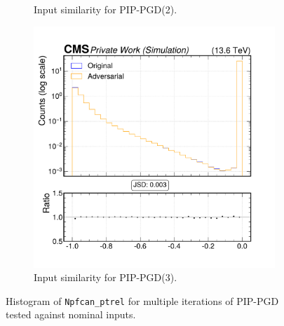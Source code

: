\begin{figure}[h]
\begin{subfigure}[t]{0.32\textwidth}
    \caption*{Input similarity for PIP-PGD(2).}
  \end{subfigure}\hfill
  \begin{subfigure}[t]{0.32\textwidth}
    \includegraphics[width=\linewidth]{media/output/features/compare/combined_it_3/cmp_npf_arr_Npfcan_ptrel.pdf}
    \caption*{Input similarity for PIP-PGD(3).}
  \end{subfigure}

  \caption*{Histogram of \texttt{Npfcan\_ptrel} for multiple iterations of PIP-PGD tested against nominal inputs.}
  \label{fig:combined_input_Npfcan_ptrel}
\end{figure}

